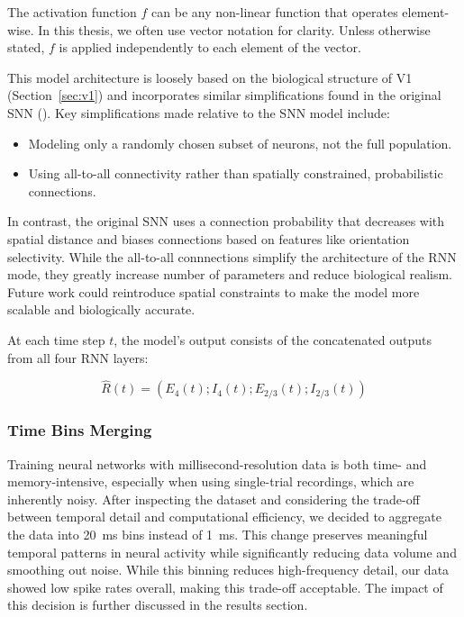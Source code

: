 The activation function $f$ can be any non-linear function that operates element-wise. In this thesis, we often use vector notation for clarity. Unless otherwise stated, $f$ is applied independently to each element of the vector.

This model architecture is loosely based on the biological structure of V1 (Section~\ref{sec:v1}) and incorporates similar simplifications found in the original SNN (\citet{antolik2024comprehensive}). Key simplifications made relative to the SNN model include:
\begin{itemize}
    \item Modeling only a randomly chosen subset of neurons, not the full population.
    \item Using all-to-all connectivity rather than spatially constrained, probabilistic connections.
\end{itemize}

In contrast, the original SNN uses a connection probability that decreases with spatial distance and biases connections based on features like orientation selectivity. While the all-to-all connnections simplify the architecture of the RNN mode, they greatly increase number of parameters and reduce biological realism. Future work could reintroduce spatial constraints to make the model more scalable and biologically accurate.

At each time step $t$, the model's output consists of the concatenated outputs from all four RNN layers:

$$\hat{R}(t) = (E_4(t); I_4(t); E_{2/3}(t); I_{2/3}(t))$$

\subsubsection{Time Bins Merging}
\label{subsubsec:time_bins_merging}

Training neural networks with millisecond-resolution data is both time- and memory-intensive, especially when using single-trial recordings, which are inherently noisy. After inspecting the dataset and considering the trade-off between temporal detail and computational efficiency, we decided to aggregate the data into 20~ms bins instead of 1~ms. This change preserves meaningful temporal patterns in neural activity while significantly reducing data volume and smoothing out noise. While this binning reduces high-frequency detail, our data showed low spike rates overall, making this trade-off acceptable. The impact of this decision is further discussed in the results section.

